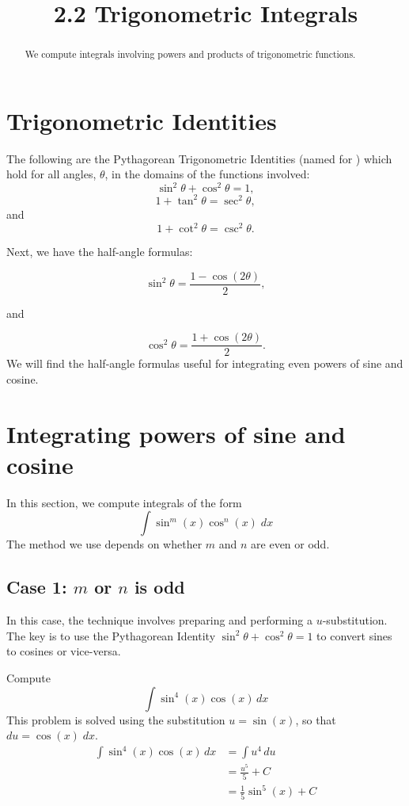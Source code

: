 \documentclass{ximera}
\title{2.2 Trigonometric Integrals}
\begin{document}
\begin{abstract}
We compute integrals involving powers and products of trigonometric functions.
\end{abstract}

\maketitle

\section{Trigonometric Identities}

The following are the Pythagorean Trigonometric Identities 
(named for ) which hold for all angles,
$\theta$, in the domains of the functions involved:
\[
\sin^2\theta + \cos^2\theta = 1,
\]
\[
1 + \tan^2\theta = \sec^2\theta,
\]
and
\[
1 + \cot^2\theta = \csc^2\theta.
\]


Next, we have the half-angle formulas:

\[
\sin^2\theta = \frac{1-\cos(2\theta)}{2},
\]

and

\[
\cos^2\theta = \frac{1+\cos(2\theta)}{2}.
\]
We will find the half-angle formulas useful for integrating even powers of sine and cosine.

\section{Integrating powers of sine and cosine}

In this section, we compute integrals of the form
\[
\int \sin^m(x) \cos^n(x) \; dx
\]
The method we use depends on whether $m$ and $n$ are even or odd.

\subsection{Case 1: $m$ or $n$ is odd}
In this case, the technique involves preparing and performing a $u$-substitution. The key is to use the Pythagorean 
Identity $\sin^2 \theta + \cos^2 \theta = 1$ to convert
sines to cosines or vice-versa.

\begin{example}[example 1]
Compute
\[
\int \sin^4(x) \cos(x) \, dx
\]
This problem is solved using the substitution $u = \sin(x)$, so that $du = \cos(x) \; dx$.
\begin{align*}
\int \sin^4(x) \cos(x) \, dx &= \int u^4 \, du\\
                             &= \frac{u^5}{5} + C\\
                             &= \frac15 \sin^5(x) + C
\end{align*}

\end{example}
\end{document}
